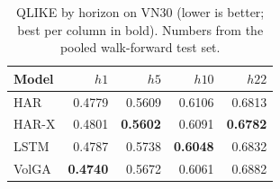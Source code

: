 \begin{table}[t]
\centering
\caption{QLIKE by horizon on VN30 (lower is better; best per column in bold). Numbers from the pooled walk-forward test set.}
\label{tab:qlike_vn30}
\begin{tabular}{lrrrr}
\toprule
Model & $h1$ & $h5$ & $h10$ & $h22$ \\
\midrule
HAR & 0.4779 & 0.5609 & 0.6106 & 0.6813 \\
HAR-X & 0.4801 & \textbf{0.5602} & 0.6091 & \textbf{0.6782} \\
LSTM & 0.4787 & 0.5738 & \textbf{0.6048} & 0.6832 \\
VolGA & \textbf{0.4740} & 0.5672 & 0.6061 & 0.6882 \\
\bottomrule
\end{tabular}
\end{table}
